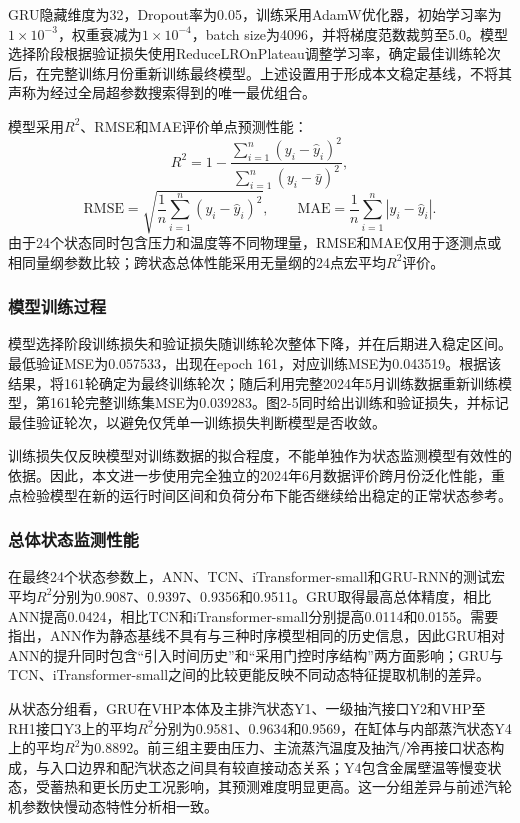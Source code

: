 GRU隐藏维度为32，Dropout率为0.05，训练采用AdamW优化器，初始学习率为$1\times10^{-3}$，权重衰减为$1\times10^{-4}$，batch size为4096，并将梯度范数裁剪至5.0。模型选择阶段根据验证损失使用ReduceLROnPlateau调整学习率，确定最佳训练轮次后，在完整训练月份重新训练最终模型。上述设置用于形成本文稳定基线，不将其声称为经过全局超参数搜索得到的唯一最优组合。

模型采用$R^2$、RMSE和MAE评价单点预测性能：
\begin{equation}
R^2=1-\frac{\sum_{i=1}^{n}(y_i-\hat y_i)^2}{\sum_{i=1}^{n}(y_i-\bar y)^2},
\end{equation}
\begin{equation}
\mathrm{RMSE}=\sqrt{\frac{1}{n}\sum_{i=1}^{n}(y_i-\hat y_i)^2},\qquad
\mathrm{MAE}=\frac{1}{n}\sum_{i=1}^{n}|y_i-\hat y_i|.
\end{equation}
由于24个状态同时包含压力和温度等不同物理量，RMSE和MAE仅用于逐测点或相同量纲参数比较；跨状态总体性能采用无量纲的24点宏平均$R^2$评价。

\subsubsection{模型训练过程}

模型选择阶段训练损失和验证损失随训练轮次整体下降，并在后期进入稳定区间。最低验证MSE为0.057533，出现在epoch 161，对应训练MSE为0.043519。根据该结果，将161轮确定为最终训练轮次；随后利用完整2024年5月训练数据重新训练模型，第161轮完整训练集MSE为0.039283。图2-5同时给出训练和验证损失，并标记最佳验证轮次，以避免仅凭单一训练损失判断模型是否收敛。

训练损失仅反映模型对训练数据的拟合程度，不能单独作为状态监测模型有效性的依据。因此，本文进一步使用完全独立的2024年6月数据评价跨月份泛化性能，重点检验模型在新的运行时间区间和负荷分布下能否继续给出稳定的正常状态参考。

\subsubsection{总体状态监测性能}

在最终24个状态参数上，ANN、TCN、iTransformer-small和GRU-RNN的测试宏平均$R^2$分别为0.9087、0.9397、0.9356和0.9511。GRU取得最高总体精度，相比ANN提高0.0424，相比TCN和iTransformer-small分别提高0.0114和0.0155。需要指出，ANN作为静态基线不具有与三种时序模型相同的历史信息，因此GRU相对ANN的提升同时包含“引入时间历史”和“采用门控时序结构”两方面影响；GRU与TCN、iTransformer-small之间的比较更能反映不同动态特征提取机制的差异。

从状态分组看，GRU在VHP本体及主排汽状态Y1、一级抽汽接口Y2和VHP至RH1接口Y3上的平均$R^2$分别为0.9581、0.9634和0.9569，在缸体与内部蒸汽状态Y4上的平均$R^2$为0.8892。前三组主要由压力、主流蒸汽温度及抽汽/冷再接口状态构成，与入口边界和配汽状态之间具有较直接动态关系；Y4包含金属壁温等慢变状态，受蓄热和更长历史工况影响，其预测难度明显更高。这一分组差异与前述汽轮机参数快慢动态特性分析相一致。

